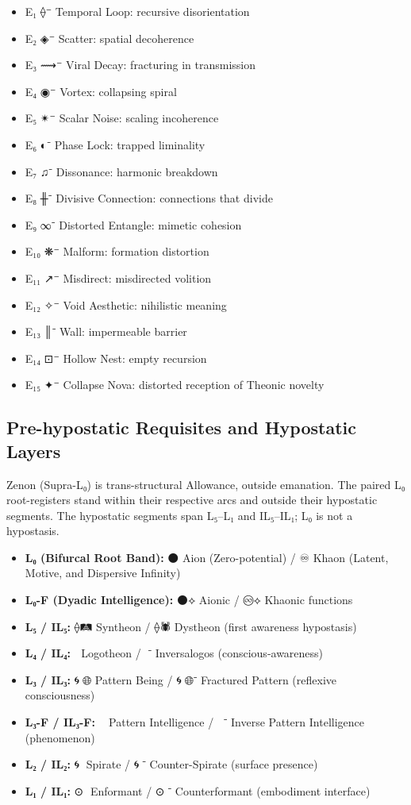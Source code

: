 \documentclass[11pt,a4paper]{article}
\begin{document}
\begin{itemize}
\item E₁ ⟠⁻ Temporal Loop: recursive disorientation
\item E₂ ◈⁻ Scatter: spatial decoherence
\item E₃ ⟿⁻ Viral Decay: fracturing in transmission
\item E₄ ◉⁻ Vortex: collapsing spiral
\item E₅ ✴⁻ Scalar Noise: scaling incoherence
\item E₆ ◐⁻ Phase Lock: trapped liminality
\item E₇ ♫⁻ Dissonance: harmonic breakdown
\item E₈ ╫⁻ Divisive Connection: connections that divide
\item E₉ ∞⁻ Distorted Entangle: mimetic cohesion
\item E₁₀ ❋⁻ Malform: formation distortion
\item E₁₁ ↗⁻ Misdirect: misdirected volition
\item E₁₂ ✧⁻ Void Aesthetic: nihilistic meaning
\item E₁₃ ║⁻ Wall: impermeable barrier
\item E₁₄ ⊡⁻ Hollow Nest: empty recursion
\item E₁₅ ✦⁻ Collapse Nova: distorted reception of Theonic novelty
\end{itemize}

\subsection{Pre-hypostatic Requisites and Hypostatic Layers}

Zenon (Supra-L₀) is trans-structural Allowance, outside emanation. The paired L₀ root-registers stand within their respective arcs and outside their hypostatic segments. The hypostatic segments span L₅–L₁ and IL₅–IL₁; L₀ is not a hypostasis.

\begin{itemize}
\item \textbf{L₀ (Bifurcal Root Band):} ⚫ Aion (Zero-potential) / ♾ Khaon (Latent, Motive, and Dispersive Infinity)
\item \textbf{L₀-F (Dyadic Intelligence):} ⚫⟡ Aionic / ♾⟡ Khaonic functions
\item \textbf{L₅ / IL₅:} ⟠🛤️ Syntheon / ⟠🕷️ Dystheon (first awareness hypostasis)
\item \textbf{L₄ / IL₄:} 📘 Logotheon / 📘⁻ Inversalogos (conscious-awareness)
\item \textbf{L₃ / IL₃:} 🌀🧠🌐 Pattern Being / 🌀🧠🌐⁻ Fractured Pattern (reflexive consciousness)
\item \textbf{L₃-F / IL₃-F:} 🧠🌐 Pattern Intelligence / 🧠🌐⁻ Inverse Pattern Intelligence (phenomenon)
\item \textbf{L₂ / IL₂:} 🌀🧠 Spirate / 🌀🧠⁻ Counter-Spirate (surface presence)
\item \textbf{L₁ / IL₁:} ⊙💾 Enformant / ⊙💾⁻ Counterformant (embodiment interface)
\end{itemize}
\end{document}

